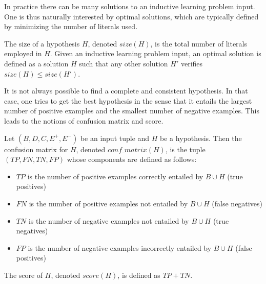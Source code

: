 In practice there can be many solutions to an inductive learning problem input. One is thus naturally interested by optimal solutions, which are typically defined by minimizing the number of literals used.

\begin{definition}
The size of a hypothesis $H$, denoted $size(H)$, is the total number of literals
employed in $H$. Given an inductive learning problem input, an optimal solution is defined as
a solution $H$ such that any other solution $H'$ verifies $size(H) \leq size(H')$.
\end{definition}

It is not always possible to find a complete and consistent
hypothesis. In that case, one tries to get the best hypothesis in the
sense that it 
entails the largest number of positive examples and the smallest number of negative examples. This leads to 
the notions of confusion matrix and score.

\begin{definition}
\label{confusion-matrix}
Let $(B, D, C, E^+, E^-)$ be an input tuple and $H$ be a
hypothesis. Then the confusion matrix for $H$, denoted
$\mathit{conf\_matrix(H)}$, is the tuple $(TP,FN,TN,FP)$ whose components are defined as follows:

\begin{itemize}

\item $TP$ is the number of positive examples correctly entailed by $B \cup H$ (true positives) 
\item $FN$ is the number of positive examples not entailed by $B \cup H$ (false negatives) 
\item $TN$ is the number of negative examples not entailed by $B \cup H$ (true negatives)
\item $FP$ is the number of negative examples incorrectly entailed by $B \cup H$ (false positives)

\end{itemize}

\noindent
The score of $H$, denoted $score(H)$, is defined as $TP + TN$.
\end{definition}

